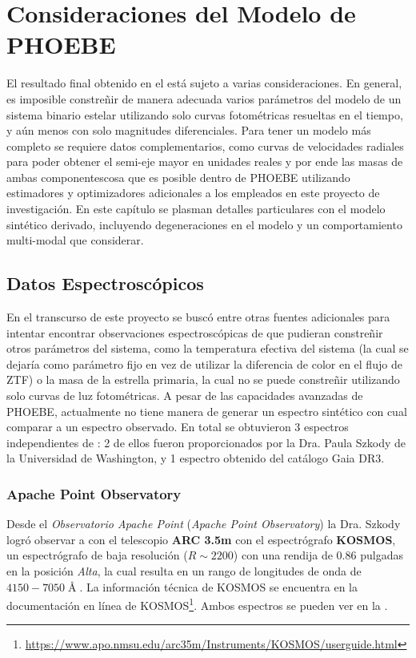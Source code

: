 \chapter{Consideraciones del Modelo de PHOEBE}

El resultado final obtenido en el
 está sujeto a varias
consideraciones. En general, es imposible constreñir de manera adecuada varios
parámetros del modelo de un sistema binario estelar utilizando solo curvas
fotométricas resueltas en el tiempo, y aún menos con solo magnitudes
diferenciales. Para tener un modelo más completo se requiere datos
complementarios, como curvas de velocidades radiales para poder obtener el
semi-eje mayor en unidades reales y por ende las masas de ambas
componentes\textemdash cosa que es posible dentro de PHOEBE utilizando
estimadores y optimizadores adicionales a los empleados en este proyecto de
investigación. En este capítulo se plasman detalles particulares con el modelo
sintético derivado, incluyendo degeneraciones en el modelo y un comportamiento
multi-modal que considerar.

\section{Datos Espectroscópicos}

En el transcurso de este proyecto se buscó entre otras fuentes adicionales para
intentar encontrar observaciones espectroscópicas de \atoObjId que pudieran
constreñir otros parámetros del sistema, como la temperatura efectiva del
sistema (la cual se dejaría como parámetro fijo en vez de utilizar la diferencia
de color en el flujo de ZTF) o la masa de la estrella primaria, la cual no se
puede constreñir utilizando solo curvas de luz fotométricas. A pesar de las
capacidades avanzadas de PHOEBE, actualmente no tiene manera de generar un
espectro sintético con cual comparar a un espectro observado. En total se
obtuvieron 3 espectros independientes de \atoObjIdNoSpace : 2 de ellos fueron
proporcionados por la Dra. Paula Szkody de la Universidad de Washington, y 1
espectro obtenido del catálogo Gaia DR3.

\subsection{Apache Point Observatory}

Desde el \textit{Observatorio Apache Point} (\textit{Apache Point Observatory})
la Dra. Szkody logró observar a \atoObjId con el telescopio \textbf{ARC 3.5m}
con el espectrógrafo \textbf{KOSMOS}, un espectrógrafo de baja resolución ($R
\sim 2200$) con una rendija de 0.86 pulgadas en la posición \textit{Alta}, la
cual resulta en un rango de longitudes de onda de $4150 - 7050 \Angstrom$. La
información técnica de KOSMOS se encuentra en la documentación en línea de
KOSMOS\footnote{\url{https://www.apo.nmsu.edu/arc35m/Instruments/KOSMOS/userguide.html}}.
Ambos espectros se pueden ver en la .

